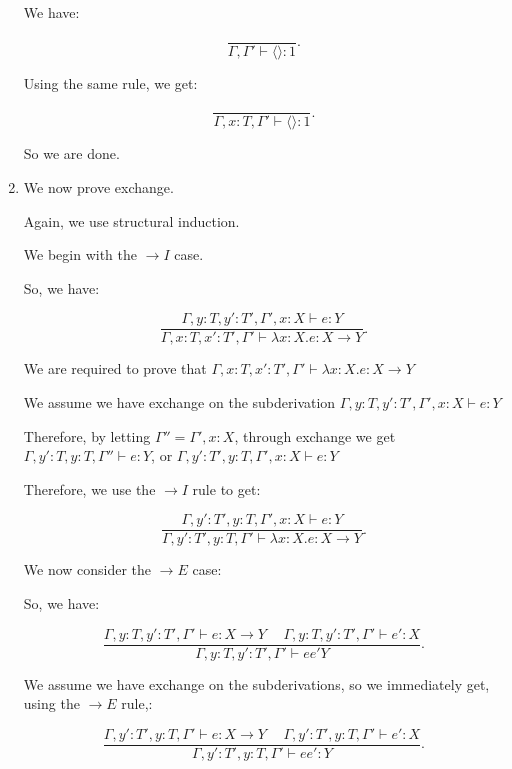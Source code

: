 \begin{enumerate}
      We have:

      \[
        \frac{}{\Gamma,\Gamma' \vdash \langle \rangle : 1}
      .\] 

      Using the same rule, we get:

      \[
        \frac{}{\Gamma, x : T, \Gamma' \vdash \langle \rangle : 1}
      .\] 

      So we are done.

    \item
      We now prove exchange.

      Again, we use structural induction.

      We begin with the $\rightarrow I$ case.

      So, we have:

      \[
        \frac{\Gamma, y : T, y': T', \Gamma', x : X \vdash e : Y}{\Gamma, x : T, x' : T', \Gamma' \vdash \lambda x : X. e : X \rightarrow Y}
      .\] 

      We are required to prove that $\Gamma, x : T, x' : T', \Gamma' \vdash \lambda x : X. e : X \rightarrow Y$

      We assume we have exchange on the subderivation $\Gamma, y : T, y' : T', \Gamma', x : X \vdash e : Y$

      Therefore, by letting $\Gamma'' = \Gamma', x : X$, through exchange we get $\Gamma, y' : T, y : T, \Gamma'' \vdash e : Y$, or $\Gamma, y' : T', y : T, \Gamma', x : X \vdash e : Y$

      Therefore, we use the $\rightarrow I$ rule to get:

      \[
        \frac{\Gamma, y': T', y : T, \Gamma', x : X \vdash e : Y}{\Gamma, y' : T', y : T, \Gamma ' \vdash \lambda x : X. e : X \rightarrow Y}
      .\] 

      We now consider the $\rightarrow E$ case:

      So, we have:

      \[
        \frac{\Gamma, y : T, y' : T', \Gamma' \vdash e : X \rightarrow Y \hspace{15pt} \Gamma, y : T, y' : T', \Gamma' \vdash e' : X}{\Gamma, y : T, y' : T', \Gamma' \vdash e e' Y}
      .\] 

      We assume we have exchange on the subderivations, so we immediately get, using the $\rightarrow E$ rule,:

      \[
        \frac{\Gamma, y' : T', y : T, \Gamma' \vdash e : X \rightarrow Y \hspace{15pt} \Gamma, y' : T', y : T, \Gamma' \vdash e' : X}{\Gamma, y' : T', y : T, \Gamma' \vdash e e' : Y}
      .\] 


\end{enumerate}
